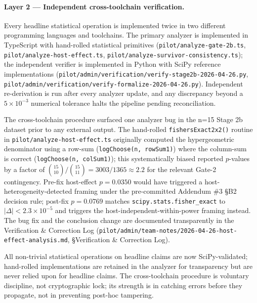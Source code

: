 \paragraph{Layer 2 --- Independent cross-toolchain verification.}
Every headline statistical operation is implemented twice in two different programming languages and toolchains. The primary analyzer is implemented in TypeScript with hand-rolled statistical primitives (\texttt{pilot/analyze-gate-2b.ts}, \texttt{pilot/analyze-host-effect.ts}, \texttt{pilot/analyze-survivor-consistency.ts}); the independent verifier is implemented in Python with SciPy reference implementations (\texttt{pilot/admin/verification/verify-stage2b-2026-04-26.py}, \texttt{pilot/admin/verification/verify-formalize-2026-04-26.py}). Independent re-derivation is run after every analyzer update, and any discrepancy beyond a $5 \times 10^{-3}$ numerical tolerance halts the pipeline pending reconciliation.

The cross-toolchain procedure surfaced one analyzer bug in the n=15 Stage 2b dataset prior to any external output. The hand-rolled \texttt{fishersExact2x2()} routine in \texttt{pilot/analyze-host-effect.ts} originally computed the hypergeometric denominator using a row-sum (\texttt{logChoose(n, rowSum1)}) where the column-sum is correct (\texttt{logChoose(n, colSum1)}); this systematically biased reported $p$-values by a factor of $\binom{15}{10}/\binom{15}{11} = 3003/1365 \approx 2.2$ for the relevant Gate-2 contingency. Pre-fix host-effect $p = 0.0350$ would have triggered a host-heterogeneity-detected framing under the pre-committed Addendum \#3 \S B2 decision rule; post-fix $p = 0.0769$ matches \texttt{scipy.stats.fisher\_exact} to $|\Delta| < 2.3 \times 10^{-5}$ and triggers the host-independent-within-power framing instead. The bug fix and the conclusion change are documented transparently in the Verification \& Correction Log (\texttt{pilot/admin/team-notes/2026-04-26-host-effect-analysis.md}, \S Verification \& Correction Log).

All non-trivial statistical operations on headline claims are now SciPy-validated; hand-rolled implementations are retained in the analyzer for transparency but are never relied upon for headline claims. The cross-toolchain procedure is voluntary discipline, not cryptographic lock; its strength is in catching errors before they propagate, not in preventing post-hoc tampering.

